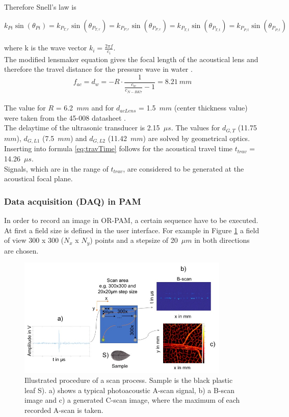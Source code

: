 Therefore Snell's law is 

\begin{equation}
	k_{Pi} \sin(\theta_{Pi}) = k_{P_{T,r}} \sin(\theta_{P_{T,r}}) = k_{P_{P,r}} \sin(\theta_{P_{P,r}}) = k_{P_{T,t}} \sin(\theta_{P_{T,t}}) = k_{P_{P,t}} \sin(\theta_{P_{P,t}})
\end{equation}
\\
where k is the wave vector $k_i = \frac{2 \pi f}{c_i}$. \\
The modified lensmaker equation gives the focal length of the acoustical lens and therefore the travel distance for the pressure wave in water \cite{GraflMonika2015Pm}.
\begin{equation}
f_{ac} = d_w = - R \cdot \frac{1}{\frac{c_w}{c_{N-BK7}}-1} = 8.21~mm
\end{equation}
\\
The value for $R$ = 6.2~$mm$ and for $d_{acLens}$ = 1.5~$mm$ (center thickness value) were taken from the 45-008 datasheet \cite{data:45008}.\\
The delaytime of the ultrasonic transducer is 2.15~$\mu s$. The values for $d_{G,T}$ (11.75~$mm$), $d_{G,L1}$ (7.5~$mm$) and $d_{G,L2}$ (11.42~$mm$) are solved by geometrical optics. \\
Inserting into formula \ref{eq:travTime} follows for the acoustical travel time $t_{trav}$ = 14.26~$\mu s$.\\
Signals, which are in the range of $t_{trav}$,  are considered to be generated at the acoustical focal plane.
\pagebreak
\subsubsection{Data acquisition (DAQ) in PAM}
\label{sec:DAQ}

In order to record an image in OR-PAM, a certain sequence have to be executed. \\
At first a field size is defined in the user interface. For example in Figure \ref{fig:scanProcess} a field of view 300 x 300 ($N_x$ x $N_y$) points and a  stepsize of 20~$\mu m$ in both directions are chosen. 

\begin{figure}[H]
	\centering
	\includegraphics[width = 0.9\textwidth]{02_principles_of_photoacoustics/images/scanProcess.jpg}
	\caption{Illustrated procedure of a scan process. Sample is the black plastic leaf S). a) shows a typical photoacoustic A-scan signal, b) a B-scan image and c) a generated C-scan image, where the maximum of each recorded A-scan is taken.}
	\label{fig:scanProcess}
\end{figure}

